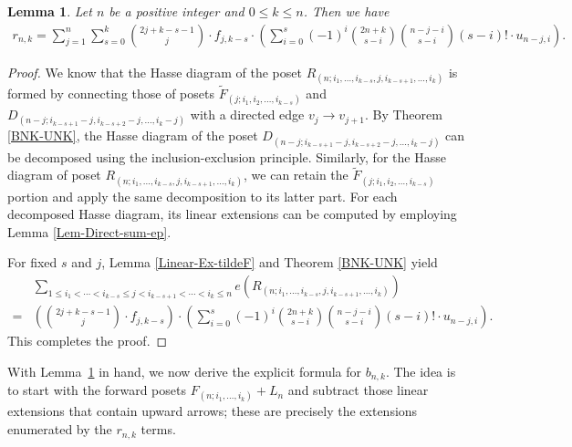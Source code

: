\documentclass[reqno, 12pt]{article}
\newtheorem{lem}[thm]{Lemma}
\theoremstyle{mydefinition}
\theoremstyle{myremark}
\numberwithin{algorithm}{section}
\begin{document}
\begin{lem}\label{Rnk-js}
Let $n$ be a positive integer and $0\leq k\leq n$. Then we have
\begin{align*}
r_{n,k}=\sum_{j=1}^n \sum_{s=0}^k \binom{2j+k-s-1}{j}\cdot f_{j,k-s}\cdot \left(\sum_{i=0}^s(-1)^i\binom{2n+k}{s-i}\binom{n-j-i}{s-i}(s-i)!\cdot u_{n-j,i}\right).
\end{align*}
\end{lem}
\begin{proof}
We know that the Hasse diagram of the poset $R_{(n; i_1,\ldots,i_{k-s},j,i_{k-s+1},\ldots,i_k)}$ is formed by connecting those of posets $\widetilde{F}_{(j; i_1,i_2,\ldots,i_{k-s})}$ and $D_{(n-j; i_{k-s+1}-j,i_{k-s+2}-j,\ldots,i_{k}-j)}$ with a directed edge $v_j\to v_{j+1}$.
By Theorem \ref{BNK-UNK}, the Hasse diagram of the poset $D_{(n-j; i_{k-s+1}-j,i_{k-s+2}-j,\ldots,i_{k}-j)}$ can be decomposed using the inclusion-exclusion principle. Similarly, for the Hasse diagram of poset $R_{(n; i_1,\ldots,i_{k-s},j,i_{k-s+1},\ldots,i_k)}$, we can retain the $\widetilde{F}_{(j; i_1,i_2,\ldots,i_{k-s})}$ portion and apply the same decomposition to its latter part.
For each decomposed Hasse diagram, its linear extensions can be computed by employing Lemma \ref{Lem-Direct-sum-ep}.

For fixed $s$ and $j$, Lemma \ref{Linear-Ex-tildeF} and Theorem \ref{BNK-UNK} yield
\begin{align*}
&\sum_{1\leq i_1<\cdots <i_{k-s}\leq j< i_{k-s+1}<\cdots <i_k\leq n} e(R_{(n; i_1,\ldots,i_{k-s},j,i_{k-s+1},\ldots,i_k)})
\\=&\left(\binom{2j+k-s-1}{j}\cdot f_{j,k-s}\right)\cdot \left(\sum_{i=0}^s(-1)^i\binom{2n+k}{s-i}\binom{n-j-i}{s-i}(s-i)!\cdot u_{n-j,i}\right).
\end{align*}
This completes the proof.
\end{proof}


With Lemma~\ref{Rnk-js} in hand, we now derive the explicit formula for $b_{n,k}$.
The idea is to start with the forward posets $F_{(n; i_1,\ldots,i_k)}+L_n$ and subtract those linear extensions that contain upward arrows; these are precisely the extensions enumerated by the $r_{n,k}$ terms.
\end{document}
